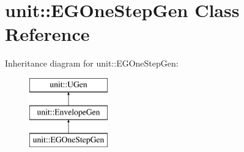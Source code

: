 \hypertarget{classunit_1_1EGOneStepGen}{}\section{unit\+:\+:E\+G\+One\+Step\+Gen Class Reference}
\label{classunit_1_1EGOneStepGen}
Inheritance diagram for unit\+:\+:E\+G\+One\+Step\+Gen\+:\begin{figure}[H]
\begin{center}
\leavevmode
\includegraphics[height=3.000000cm]{classunit_1_1EGOneStepGen}
\end{center}
\end{figure}
